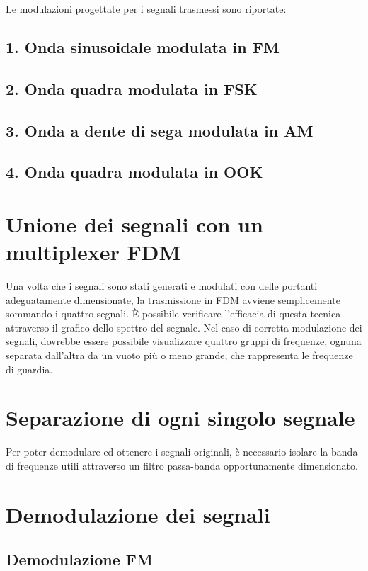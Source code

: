 \documentclass{article}
\begin{document}
Le modulazioni progettate per i segnali trasmessi sono riportate:

\subsection{1. Onda sinusoidale modulata in FM}
\subsection{2. Onda quadra modulata in FSK}
\subsection{3. Onda a dente di sega modulata in AM}
\subsection{4. Onda quadra modulata in OOK}

\section{Unione dei segnali con un multiplexer FDM}
Una volta che i segnali sono stati generati e modulati con delle portanti adeguatamente dimensionate, la trasmissione in FDM
avviene semplicemente sommando i quattro segnali. È possibile verificare l'efficacia di questa tecnica attraverso il grafico
dello spettro del segnale. Nel caso di corretta modulazione dei segnali, dovrebbe essere possibile visualizzare quattro gruppi
di frequenze, ognuna separata dall'altra da un vuoto più o meno grande, che rappresenta le frequenze di guardia.

\section{Separazione di ogni singolo segnale}
Per poter demodulare ed ottenere i segnali originali, è necessario isolare la banda di frequenze utili attraverso un filtro
passa-banda opportunamente dimensionato.

\section{Demodulazione dei segnali}

\subsection{Demodulazione FM}
\end{document}
